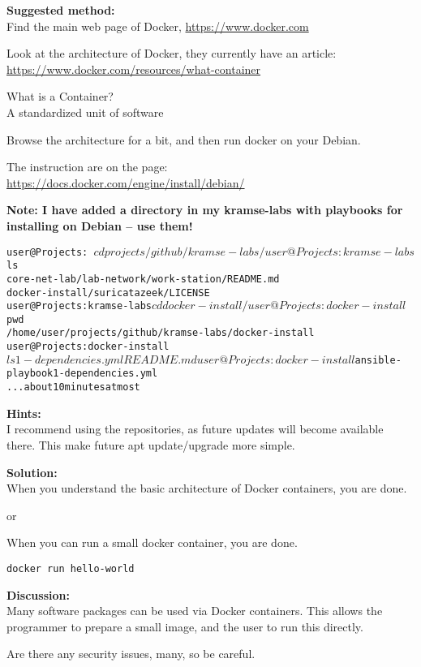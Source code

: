 \documentclass[a4paper,11pt,notitlepage]{report}
\begin{document}
{\bf Suggested method:}\\
Find the main web page of Docker, \url{https://www.docker.com}

Look at the architecture of Docker, they currently have an article:\\
\url{https://www.docker.com/resources/what-container}

What is a Container?\\
A standardized unit of software

Browse the architecture for a bit, and then run docker on your Debian.

The instruction are on the page:\\
\url{https://docs.docker.com/engine/install/debian/}

{\bf Note: I have added a directory in my kramse-labs with playbooks for installing on Debian -- use them!}

\begin{alltt}\small
user@Projects:~$ cd projects/github/kramse-labs/
user@Projects:kramse-labs$ ls
core-net-lab/	 lab-network/	work-station/  README.md
docker-install/  suricatazeek/	LICENSE
user@Projects:kramse-labs$ cd docker-install/
user@Projects:docker-install$ pwd
/home/user/projects/github/kramse-labs/docker-install
user@Projects:docker-install$ ls
1-dependencies.yml  README.md
user@Projects:docker-install$ ansible-playbook 1-dependencies.yml
... about 10 minutes at most
\end{alltt}

{\bf Hints:}\\
I recommend using the repositories, as future updates will become available there. This make future apt update/upgrade more simple.

{\bf Solution:}\\
When you understand the basic architecture of Docker containers, you are done.

or

When you can run a small docker container, you are done.


\begin{verbatim}
docker run hello-world
\end{verbatim}


{\bf Discussion:}\\
Many software packages can be used via Docker containers. This allows the programmer to prepare a small image, and the user to run this directly.

Are there any security issues, many, so be careful.
\end{document}
